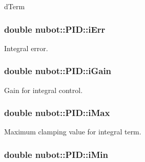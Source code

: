 d\-Term 

\hypertarget{group__gazebo__common_gabed7f1c0d6b47c154c5b8733d5c043ef}{
\subsubsection[{i\-Err}]{\setlength{\rightskip}{0pt plus 5cm}double nubot\-::\-P\-I\-D\-::i\-Err\hspace{0.3cm}{\ttfamily [private]}}}\label{group__gazebo__common_gabed7f1c0d6b47c154c5b8733d5c043ef}


Integral error. 

\hypertarget{group__gazebo__common_gac7b246ff55dc55bf825432fa362af235}{
\subsubsection[{i\-Gain}]{\setlength{\rightskip}{0pt plus 5cm}double nubot\-::\-P\-I\-D\-::i\-Gain\hspace{0.3cm}{\ttfamily [private]}}}\label{group__gazebo__common_gac7b246ff55dc55bf825432fa362af235}


Gain for integral control. 

\hypertarget{group__gazebo__common_ga23926b1473b7ad4cbbd9fb565b94712e}{
\subsubsection[{i\-Max}]{\setlength{\rightskip}{0pt plus 5cm}double nubot\-::\-P\-I\-D\-::i\-Max\hspace{0.3cm}{\ttfamily [private]}}}\label{group__gazebo__common_ga23926b1473b7ad4cbbd9fb565b94712e}


Maximum clamping value for integral term. 

\hypertarget{group__gazebo__common_gaabd36c7c162217550544931b749e4a7e}{
\subsubsection[{i\-Min}]{\setlength{\rightskip}{0pt plus 5cm}double nubot\-::\-P\-I\-D\-::i\-Min\hspace{0.3cm}{\ttfamily [private]}}}\label{group__gazebo__common_gaabd36c7c162217550544931b749e4a7e}


